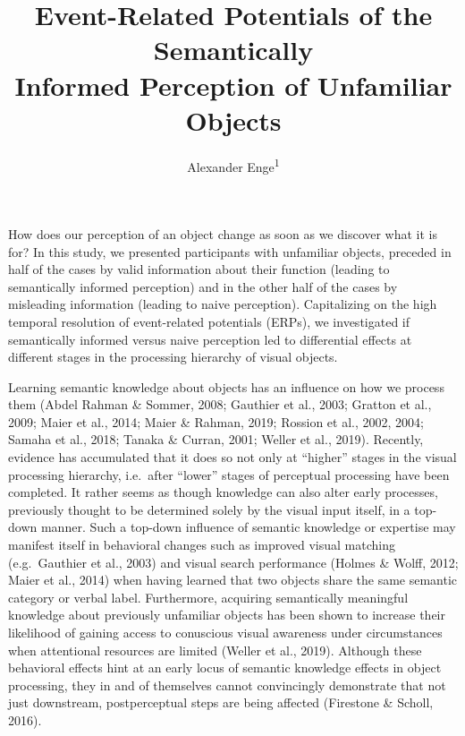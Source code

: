 \documentclass[
  english,
  man,11pt,floatsintext]{apa7}
\title{Event-Related Potentials of the Semantically\\
Informed Perception of Unfamiliar Objects}
\author{Alexander Enge\textsuperscript{1}}
\date{}
\affiliation{\vspace{0.5cm}\textsuperscript{1} Humboldt-Universität zu Berlin}
\begin{document}
\maketitle

How does our perception of an object change as soon as we discover what it is for? In this study, we presented participants with unfamiliar objects, preceded in half of the cases by valid information about their function (leading to semantically informed perception) and in the other half of the cases by misleading information (leading to naive perception). Capitalizing on the high temporal resolution of event-related potentials (ERPs), we investigated if semantically informed versus naive perception led to differential effects at different stages in the processing hierarchy of visual objects.

Learning semantic knowledge about objects has an influence on how we process them (Abdel Rahman \& Sommer, 2008; Gauthier et al., 2003; Gratton et al., 2009; Maier et al., 2014; Maier \& Rahman, 2019; Rossion et al., 2002, 2004; Samaha et al., 2018; Tanaka \& Curran, 2001; Weller et al., 2019). Recently, evidence has accumulated that it does so not only at ``higher'' stages in the visual processing hierarchy, i.e.~after ``lower'' stages of perceptual processing have been completed. It rather seems as though knowledge can also alter early processes, previously thought to be determined solely by the visual input itself, in a top-down manner. Such a top-down influence of semantic knowledge or expertise may manifest itself in behavioral changes such as improved visual matching (e.g.~Gauthier et al., 2003) and visual search performance (Holmes \& Wolff, 2012; Maier et al., 2014) when having learned that two objects share the same semantic category or verbal label. Furthermore, acquiring semantically meaningful knowledge about previously unfamiliar objects has been shown to increase their likelihood of gaining access to conuscious visual awareness under circumstances when attentional resources are limited (Weller et al., 2019). Although these behavioral effects hint at an early locus of semantic knowledge effects in object processing, they in and of themselves cannot convincingly demonstrate that not just downstream, postperceptual steps are being affected (Firestone \& Scholl, 2016).
\end{document}
